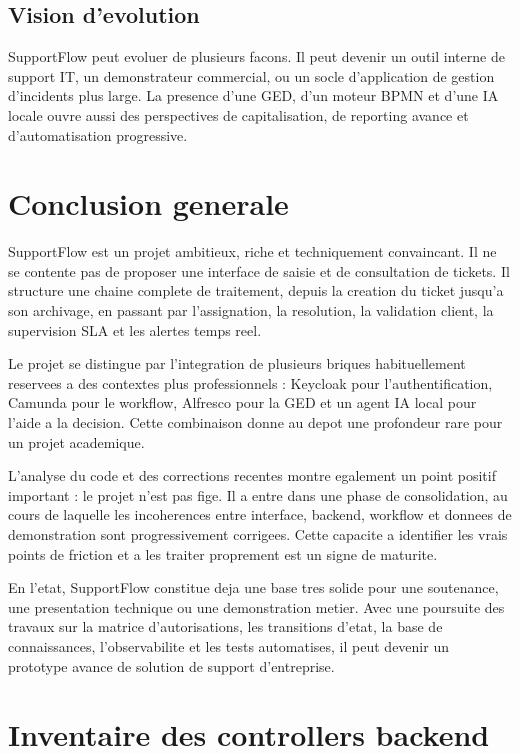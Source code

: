 \documentclass[12pt,a4paper,oneside]{report}
\begin{document}
\section{Vision d'evolution}

SupportFlow peut evoluer de plusieurs facons. Il peut devenir un outil interne de support IT, un demonstrateur commercial, ou un socle d'application de gestion d'incidents plus large. La presence d'une GED, d'un moteur BPMN et d'une IA locale ouvre aussi des perspectives de capitalisation, de reporting avance et d'automatisation progressive.

\chapter{Conclusion generale}

SupportFlow est un projet ambitieux, riche et techniquement convaincant. Il ne se contente pas de proposer une interface de saisie et de consultation de tickets. Il structure une chaine complete de traitement, depuis la creation du ticket jusqu'a son archivage, en passant par l'assignation, la resolution, la validation client, la supervision SLA et les alertes temps reel.

Le projet se distingue par l'integration de plusieurs briques habituellement reservees a des contextes plus professionnels : Keycloak pour l'authentification, Camunda pour le workflow, Alfresco pour la GED et un agent IA local pour l'aide a la decision. Cette combinaison donne au depot une profondeur rare pour un projet academique.

L'analyse du code et des corrections recentes montre egalement un point positif important : le projet n'est pas fige. Il a entre dans une phase de consolidation, au cours de laquelle les incoherences entre interface, backend, workflow et donnees de demonstration sont progressivement corrigees. Cette capacite a identifier les vrais points de friction et a les traiter proprement est un signe de maturite.

En l'etat, SupportFlow constitue deja une base tres solide pour une soutenance, une presentation technique ou une demonstration metier. Avec une poursuite des travaux sur la matrice d'autorisations, les transitions d'etat, la base de connaissances, l'observabilite et les tests automatises, il peut devenir un prototype avance de solution de support d'entreprise.

\appendix

\chapter{Inventaire des controllers backend}
\end{document}
